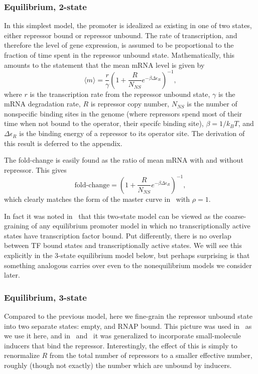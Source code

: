 \subsubsection{Equilibrium, 2-state}
In this simplest model, the promoter is idealized as existing in one of two
states, either repressor bound or repressor unbound. The rate of transcription,
and therefore the level of gene expression, is assumed to be proportional to the
fraction of time spent in the repressor unbound state. Mathematically, this
amounts to the statement that the mean mRNA level is given by
\begin{equation}
\langle m \rangle = \frac{r}{\gamma}
        \left(1 + \frac{R}{N_{NS}} e^{-\beta\Delta\epsilon_R}\right)^{-1},
\end{equation}
where $r$ is the transcription rate from the repressor unbound state, $\gamma$
is the mRNA degradation rate, $R$ is repressor copy number, $N_{NS}$ is the
number of nonspecific binding sites in the genome (where repressors spend most
of their time when not bound to the operator, their specifc binding site),
$\beta=1/k_BT$, and $\Delta\epsilon_R$ is the binding energy of a repressor to
its operator site. The derivation of this result is deferred to the appendix.

The fold-change is easily found as the ratio of mean mRNA with and without
repressor. This gives
\begin{equation}
\text{fold-change}
= \left(1 + \frac{R}{N_{NS}} e^{-\beta\Delta\epsilon_R}\right)^{-1},
\end{equation}
which clearly matches the form of the master curve in~
with $\rho=1$.

In fact it was noted in~\cite{Chure2019} that this two-state model can be viewed
as the coarse-graining of any equilibrium promoter model in which no
transcriptionally active states have transcription factor bound. Put
differently, there is no overlap between TF bound states and transcriptionally
active states. We will see this explicitly in the 3-state equilibrium model
below, but perhaps surprising is that something analogous carries over even to
the nonequilibrium models we consider later.

\subsubsection{Equilibrium, 3-state}
Compared to the previous model, here we fine-grain the repressor unbound state
into two separate states: empty, and RNAP bound. This picture was used
in~\cite{Garcia2011a} as we use it here, and in~\cite{Razo-Mejia2018}
and~\cite{Chure2019} it was generalized to incorporate small-molecule inducers
that bind the repressor. Interestingly, the effect of this is simply to
renormalize $R$ from the total number of repressors to a smaller effective
number, roughly (though not exactly) the number which are unbound by inducers.

